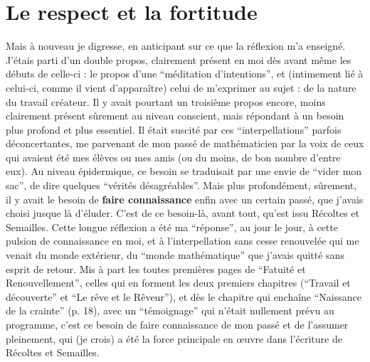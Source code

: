 \section{Le respect et la fortitude}

Mais à nouveau je digresse, en anticipant sur ce que la réflexion m'a enseigné. J'étais parti d'un double propos, clairement présent en moi dès avant même les débuts de celle-ci : le propos d'une ``méditation d'intentions'', et (intimement lié à celui-ci, comme il vient d'apparaître) celui de m'exprimer au sujet : de la nature du travail créateur. Il y avait pourtant un troisième propos encore, moins clairement présent sûrement au niveau conscient, mais répondant à un besoin plus profond et plus essentiel. Il était suscité par ces ``interpellations'' parfois déconcertantes, me parvenant de mon passé de mathématicien par la voix de ceux qui avaient été mes élèves ou mes amis (ou du moins, de bon nombre d'entre eux). Au niveau épidermique, ce besoin se traduisait par une envie de ``vider mon sac'', de dire quelques ``vérités désagréables''. Mais plus profondément, sûrement, il y avait le besoin de \textbf{faire connaissance} enfin avec un certain passé, que j'avais choisi jusque là d'éluder. C'est de ce besoin-là, avant tout, qu'est issu Récoltes et Semailles. Cette longue réflexion a été ma ``réponse'', au jour le jour, à cette pulsion de connaissance en moi, et à l'interpellation sans cesse renouvelée qui me venait du monde extérieur, du ``monde mathématique'' que j'avais quitté sans esprit de retour. Mis à part les toutes premières pages de ``Fatuité et Renouvellement'', celles qui en forment les deux premiers chapitres (``Travail et découverte'' et ``Le rêve et le Rêveur''), et dès le chapitre qui enchaîne ``Naissance de la crainte'' (p. 18), avec un ``témoignage'' qui n'était nullement prévu au programme, c'est ce besoin de faire connaissance de mon passé et de l'assumer pleinement, qui (je crois) a été la force principale en œuvre dans l'écriture de Récoltes et Semailles.

